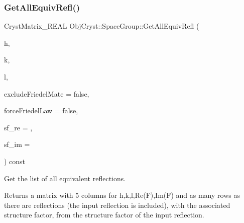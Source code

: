 \subsubsection{\texorpdfstring{GetAllEquivRefl()}{GetAllEquivRefl()}}
{\footnotesize\ttfamily Cryst\+Matrix\+\_\+\+R\+E\+AL Obj\+Cryst\+::\+Space\+Group\+::\+Get\+All\+Equiv\+Refl (\begin{DoxyParamCaption}\item[{const R\+E\+AL}]{h,  }\item[{const R\+E\+AL}]{k,  }\item[{const R\+E\+AL}]{l,  }\item[{const bool}]{exclude\+Friedel\+Mate = {\ttfamily false},  }\item[{const bool}]{force\+Friedel\+Law = {\ttfamily false},  }\item[{const R\+E\+AL}]{sf\+\_\+re = {},  }\item[{const R\+E\+AL}]{sf\+\_\+im = {} }\end{DoxyParamCaption}) const}

Get the list of all equivalent reflections.

\begin{DoxyReturn}{Returns}
a matrix with 5 columns for h,k,l,Re(\+F),Im(\+F) and as many rows as there are reflections (the input reflection is included), with the associated structure factor, from the structure factor of the input reflection. 
\end{DoxyReturn}

